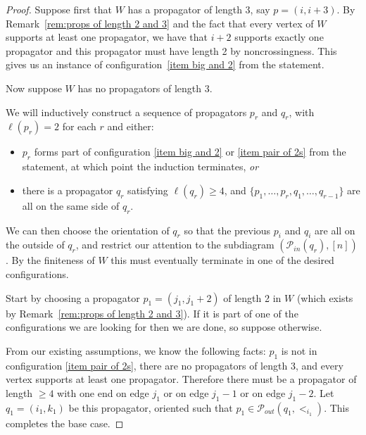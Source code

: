 \documentclass[11pt]{article}
\newcommand{\cP}{\mathcal{P}}
\theoremstyle{remark}
\theoremstyle{definition}
\begin{document}
\begin{proof}
Suppose first that $W$ has a propagator of length $3$, say $p=(i, i+3)$.  By Remark~\ref{rem:props of length 2 and 3} and the fact that every vertex of $W$ supports at least one propagator, we have that $i+2$ supports exactly one propagator and this propagator must have length 2 by noncrossingness.  This gives us an instance of configuration~\ref{item big and 2} from the statement.

Now suppose $W$ has no propagators of length $3$.





  
We will inductively construct a sequence of propagators $p_r$ and $q_r$, with $\ell(p_r) = 2$ for each $r$ and either:
\begin{itemize}
\item $p_r$ forms part of configuration \ref{item big and 2} or \ref{item pair of 2s} from the statement, at which point the induction terminates, 
{\em or} 
\item there is a propagator $q_r$ satisfying $\ell(q_r) \geq 4$, and $\{p_1, \ldots, p_r, q_1, \ldots, q_{r-1}\}$ are all on the same side of $q_r$.  
\end{itemize}
We can then choose the orientation of $q_r$ so that the previous $p_i$ and $q_i$ are all on the outside of $q_r$, and restrict our attention to the subdiagram $(\cP_{in}(q_r),[n])$. By the finiteness of $W$ this must eventually terminate in one of the desired configurations. %

Start by choosing a propagator $p_1 = (j_1,j_1+2)$ of length 2 in $W$ (which exists by Remark~\ref{rem:props of length 2 and 3}).  If it is part of one of the configurations we are looking for then we are done, 
so suppose otherwise. 

From our existing assumptions, we know the following facts: $p_1$ is not in configuration \ref{item pair of 2s}, there are no propagators of length $3$, and every vertex supports at least one propagator.  Therefore there must be a propagator of length $\geq 4$ with one end on edge $j_1$ or on edge $j_1-1$ or on edge $j_1-2$.  Let $q_1 = (i_1, k_1)$ be this propagator, oriented such that $p_1 \in \cP_{out}(q_1,<_{i_1})$. This completes the base case.


\end{proof}
\end{document}
